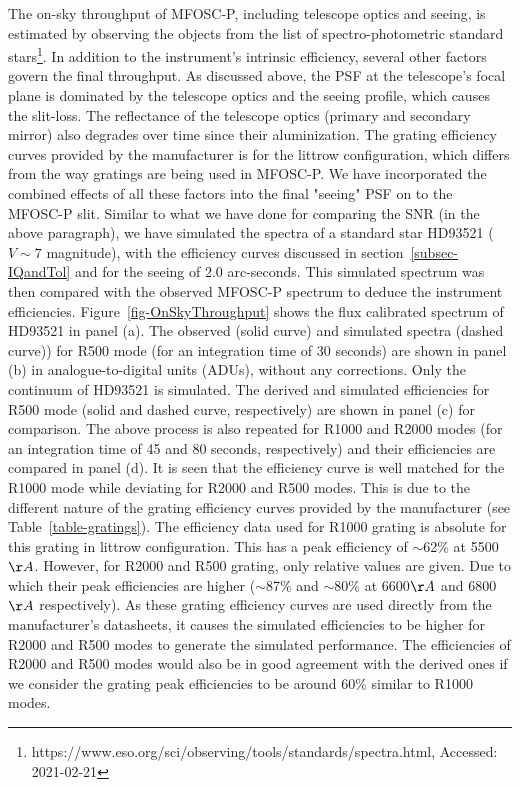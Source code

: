 The on-sky throughput of MFOSC-P, including telescope optics and seeing, is estimated by observing the objects from the list of spectro-photometric standard stars\footnote{https://www.eso.org/sci/observing/tools/standards/spectra.html, Accessed: 2021-02-21}. In addition to the instrument's intrinsic efficiency, several other factors govern the final throughput. As discussed above, the PSF at the telescope's focal plane is dominated by the telescope optics and the seeing profile, which causes the slit-loss. The reflectance of the telescope optics (primary and secondary mirror) also degrades over time since their aluminization. The grating efficiency curves provided by the manufacturer is for the littrow configuration, which differs from the way gratings are being used in MFOSC-P.  We have incorporated the combined effects of all these factors into the final "seeing" PSF on to the MFOSC-P slit. Similar to what we have done for comparing the SNR (in the above paragraph), we have simulated the spectra of a standard star HD93521 ($V \sim 7$ magnitude), with the efficiency curves discussed in section~\ref{subsec-IQandTol} and for the seeing of 2.0 arc-seconds. This simulated spectrum was then compared with the observed MFOSC-P spectrum to deduce the instrument efficiencies. Figure~\ref{fig-OnSkyThroughput} shows the flux calibrated spectrum of HD93521 in panel (a). The observed (solid curve) and simulated spectra (dashed curve)) for R500 mode (for an integration time of 30 seconds) are shown in panel (b) in analogue-to-digital units (ADUs), without any corrections. Only the continuum of HD93521 is simulated. The derived and simulated efficiencies for R500 mode (solid and dashed curve, respectively) are shown in panel (c) for comparison. The above process is also repeated for R1000 and R2000 modes (for an integration time of 45 and 80 seconds, respectively) and their efficiencies are compared in panel (d). It is seen that the efficiency curve is well matched for the R1000 mode while deviating for R2000 and R500 modes. This is due to the different nature of the grating efficiency curves provided by the manufacturer (see Table~\ref{table-gratings}). The efficiency data used for R1000 grating is absolute for this grating in littrow configuration. This has a peak efficiency of $\sim$62$\%$ at 5500$\AA$. However, for R2000 and R500 grating, only relative values are given. Due to which their peak efficiencies are higher ($\sim$87$\%$ and $\sim$80$\%$ at 6600$\AA$ and 6800$\AA$ respectively). As these grating efficiency curves are used directly from the manufacturer's datasheets, it causes the simulated efficiencies to be higher for R2000 and R500 modes to generate the simulated performance. The efficiencies of R2000 and R500 modes would also be in good agreement with the derived ones if we consider the grating peak efficiencies to be around 60$\%$ similar to R1000 modes.

